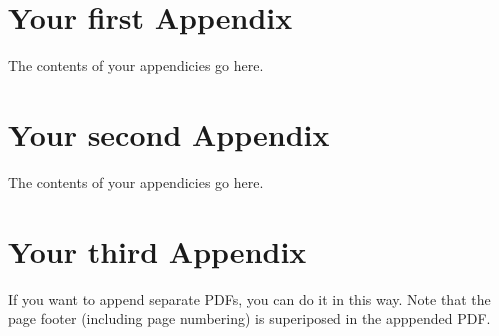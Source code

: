 \begin{appendices}
\chapter{Your first Appendix}
The contents of your appendicies go here.
\chapter{Your second Appendix}
The contents of your appendicies go here.

\chapter{Your third Appendix}
If you want to append separate PDFs, you can do it in this way. Note that the page footer (including page numbering) is superiposed in the apppended PDF.

\end{appendices}